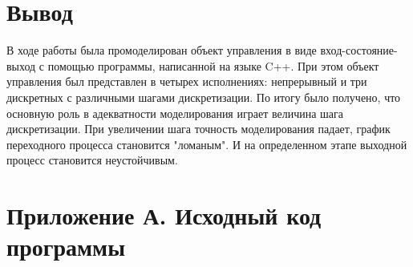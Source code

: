 \documentclass[14pt,a4paper]{extreport}
\begin{document}
\chapter*{Вывод}

В ходе работы была промоделирован объект управления в виде вход-состояние-выход 
с помощью программы, написанной на языке C++. При этом объект управления
был представлен в четырех исполнениях: непрерывный и три дискретных с 
различными шагами дискретизации. По итогу было получено, что основную
роль в адекватности моделирования играет величина шага дискретизации.
При увеличении шага точность моделирования падает, график переходного
процесса становится "ломаным". И на определенном этапе выходной процесс
становится неустойчивым.


\newpage
\chapter*{Приложение А. Исходный код программы}












\end{document}

